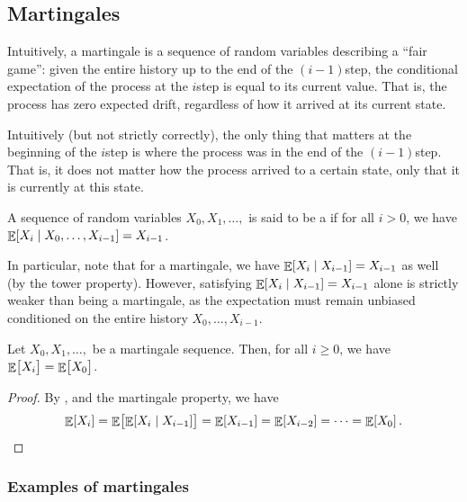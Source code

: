 \subsection{Martingales}

Intuitively, a martingale is a sequence of random variables describing
a ``fair game'': given the entire history up to the end of the
$(i-1)$\th step, the conditional expectation of the process at the
$i$\th step is equal to its current value. That is, the process has
zero expected drift, regardless of how it arrived at its current state.%

Intuitively (but not strictly correctly), the only thing that matters at
the beginning of the $i$\th step is where the process was in the end of
the $(i-1)$\th step. That is, it does not matter how the process arrived
to a certain state, only that it is currently at this state.



\begin{defn}
    A sequence of random variables $X_0, X_1, \ldots, $ is said to be
    a  if for all $i > 0$, we have
    $\mathop{\mathbb{E}}\!\left[ X_i  \;\middle\vert\; X_0, \ldots, X_{i-1} \right] = X_{i-1}$.
\end{defn}

In particular, note that for a martingale, we have
$\mathop{\mathbb{E}}\!\left[ X_i  \;\middle\vert\; X_{i-1} \right] = X_{i-1}$ as well (by the tower property).
However, satisfying $\mathop{\mathbb{E}}\!\left[ X_i \;\middle\vert\; X_{i-1} \right] = X_{i-1}$ alone is strictly
weaker than being a martingale, as the expectation must remain unbiased
conditioned on the entire history $X_0, \ldots, X_{i-1}$.%


\begin{lemma}
    Let $X_0, X_1, \ldots,$ be a martingale sequence. Then, for all $i
    \geq 0$, we have $\mathop{\mathbb{E}}\!\left[ { \bigl. X_i } \right] = \mathop{\mathbb{E}}\!\left[ { \bigl. X_0 } \right]$.
\end{lemma}

\begin{proof}
    By , and the martingale property, we have
    \begin{equation*}
        \Ex{  X_i }
        =%
        \Ex{ \bigl.  \ExCond{X_i}{ X_{i-1}} }
        =%
        \Ex{  X_{i-1} } %
        =%
        \Ex{  X_{i-2} } %
        =%
        \cdots
        =
        \Ex{ X_{0} }. %
    \end{equation*}

\end{proof}

\subsubsection{Examples of martingales}

